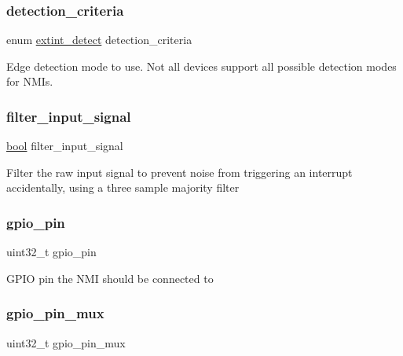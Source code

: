 \subsubsection{\texorpdfstring{detection\_criteria}{detection\_criteria}}
{\footnotesize\ttfamily enum \mbox{\hyperlink{group__asfdoc__sam0__extint__group_ga920ab9931e047b548d07ad29dedfcca2}{extint\+\_\+detect}} detection\+\_\+criteria}

Edge detection mode to use. Not all devices support all possible detection modes for N\+M\+Is. \mbox{\label{structextint__nmi__conf_a1a59d546b8bc80f31e5350a490c5b718}} 
\subsubsection{\texorpdfstring{filter\_input\_signal}{filter\_input\_signal}}
{\footnotesize\ttfamily \mbox{\hyperlink{group__group__sam0__utils_ga97a80ca1602ebf2303258971a2c938e2}{bool}} filter\+\_\+input\+\_\+signal}

Filter the raw input signal to prevent noise from triggering an interrupt accidentally, using a three sample majority filter \mbox{\label{structextint__nmi__conf_aaa3ba20871e508028b08eed10d08db84}} 
\subsubsection{\texorpdfstring{gpio\_pin}{gpio\_pin}}
{\footnotesize\ttfamily uint32\+\_\+t gpio\+\_\+pin}

G\+P\+IO pin the N\+MI should be connected to \mbox{\label{structextint__nmi__conf_ab223c84d8e5b59e9fcc8673c338a7a87}} 
\subsubsection{\texorpdfstring{gpio\_pin\_mux}{gpio\_pin\_mux}}
{\footnotesize\ttfamily uint32\+\_\+t gpio\+\_\+pin\+\_\+mux}

